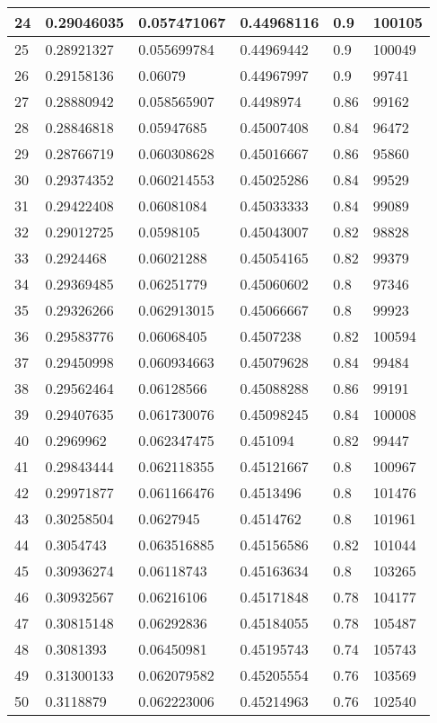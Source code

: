\begin{longtable}{|l|l|l|l|l|l|}
24 & 0.29046035 & 0.057471067 & 0.44968116 & 0.9 & 100105 \\ \hline 
25 & 0.28921327 & 0.055699784 & 0.44969442 & 0.9 & 100049 \\ \hline 
26 & 0.29158136 & 0.06079 & 0.44967997 & 0.9 & 99741 \\ \hline 
27 & 0.28880942 & 0.058565907 & 0.4498974 & 0.86 & 99162 \\ \hline 
28 & 0.28846818 & 0.05947685 & 0.45007408 & 0.84 & 96472 \\ \hline 
29 & 0.28766719 & 0.060308628 & 0.45016667 & 0.86 & 95860 \\ \hline 
30 & 0.29374352 & 0.060214553 & 0.45025286 & 0.84 & 99529 \\ \hline 
31 & 0.29422408 & 0.06081084 & 0.45033333 & 0.84 & 99089 \\ \hline 
32 & 0.29012725 & 0.0598105 & 0.45043007 & 0.82 & 98828 \\ \hline 
33 & 0.2924468 & 0.06021288 & 0.45054165 & 0.82 & 99379 \\ \hline 
34 & 0.29369485 & 0.06251779 & 0.45060602 & 0.8 & 97346 \\ \hline 
35 & 0.29326266 & 0.062913015 & 0.45066667 & 0.8 & 99923 \\ \hline 
36 & 0.29583776 & 0.06068405 & 0.4507238 & 0.82 & 100594 \\ \hline 
37 & 0.29450998 & 0.060934663 & 0.45079628 & 0.84 & 99484 \\ \hline 
38 & 0.29562464 & 0.06128566 & 0.45088288 & 0.86 & 99191 \\ \hline 
39 & 0.29407635 & 0.061730076 & 0.45098245 & 0.84 & 100008 \\ \hline 
40 & 0.2969962 & 0.062347475 & 0.451094 & 0.82 & 99447 \\ \hline 
41 & 0.29843444 & 0.062118355 & 0.45121667 & 0.8 & 100967 \\ \hline 
42 & 0.29971877 & 0.061166476 & 0.4513496 & 0.8 & 101476 \\ \hline 
43 & 0.30258504 & 0.0627945 & 0.4514762 & 0.8 & 101961 \\ \hline 
44 & 0.3054743 & 0.063516885 & 0.45156586 & 0.82 & 101044 \\ \hline 
45 & 0.30936274 & 0.06118743 & 0.45163634 & 0.8 & 103265 \\ \hline 
46 & 0.30932567 & 0.06216106 & 0.45171848 & 0.78 & 104177 \\ \hline 
47 & 0.30815148 & 0.06292836 & 0.45184055 & 0.78 & 105487 \\ \hline 
48 & 0.3081393 & 0.06450981 & 0.45195743 & 0.74 & 105743 \\ \hline 
49 & 0.31300133 & 0.062079582 & 0.45205554 & 0.76 & 103569 \\ \hline 
50 & 0.3118879 & 0.062223006 & 0.45214963 & 0.76 & 102540 \\ \hline 
\end{longtable}